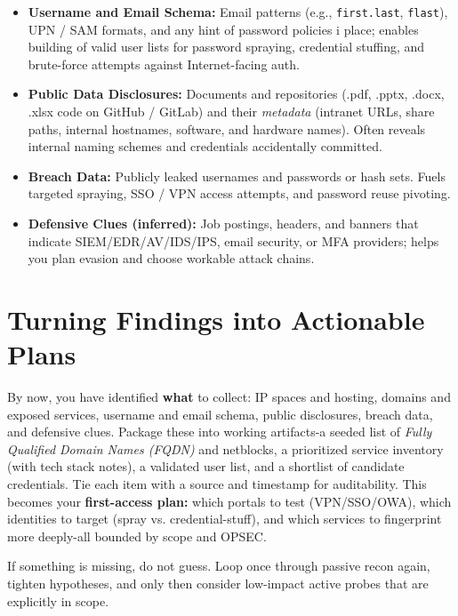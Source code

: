 \begin{itemize}
    \item \textbf{Username and Email Schema:} Email patterns (e.g., \texttt{first.last}, \texttt{flast}), UPN / SAM formats, and any hint of password policies i place; enables building of valid user lists for password spraying, credential stuffing, and brute-force attempts against Internet-facing auth.
    \item \textbf{Public Data Disclosures:} Documents and repositories (.pdf, .pptx, .docx, .xlsx code on GitHub / GitLab) and their \textit{metadata} (intranet URLs, share paths, internal hostnames, software, and hardware names). Often reveals internal naming schemes and credentials accidentally committed.
    \item \textbf{Breach Data:} Publicly leaked usernames and passwords or hash sets. Fuels targeted spraying, SSO / VPN access attempts, and password reuse pivoting.
    \item \textbf{Defensive Clues (inferred):} Job postings, headers, and banners that indicate SIEM/EDR/AV/IDS/IPS, email security, or MFA providers; helps you plan evasion and choose workable attack chains.
\end{itemize}

\section{Turning Findings into Actionable Plans}
By now, you have identified \textbf{what} to collect: IP spaces and hosting, domains and exposed services, username and email schema, public disclosures, breach data, and defensive clues. Package these into working artifacts-a seeded list of \textit{Fully Qualified Domain Names (FQDN)} and netblocks, a prioritized service inventory (with tech stack notes), a validated user list, and a shortlist of candidate credentials. Tie each item with a source and timestamp for auditability. This becomes your \textbf{first-access plan:} which portals to test (VPN/SSO/OWA), which identities to target (spray vs. credential-stuff), and which services to fingerprint more deeply-all bounded by scope and OPSEC.

If something is missing, do not guess. Loop once through passive recon again, tighten hypotheses, and only then consider low-impact active probes that are explicitly in scope.


